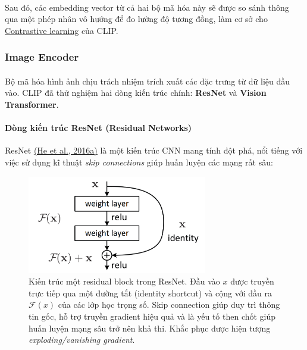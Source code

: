 \paragraph{}{Sau đó, các embedding vector từ cả hai bộ mã hóa này sẽ được so sánh thông qua một phép nhân vô hướng để đo lường độ tương đồng, làm cơ sở cho \hyperref[subsec:contrastive_learning]{Contrastive learning} của CLIP.}
\subsubsection{Image Encoder}
\paragraph{}{Bộ mã hóa hình ảnh chịu trách nhiệm trích xuất các đặc trưng từ dữ liệu đầu vào. CLIP đã thử nghiệm hai dòng kiến trúc chính: \textbf{ResNet} và \textbf{Vision Transformer}.}
\paragraph{Dòng kiến trúc ResNet (Residual Networks)}
ResNet \hyperref[resnet]{(He et al., 2016a)} là một kiến trúc CNN mang tính đột phá, nổi tiếng với việc sử dụng kĩ thuật \textit{skip connections} giúp huấn luyện các mạng rất sâu: 
\begin{figure}[H]
\centering
    \includegraphics[width=0.7\textwidth]{img/03-skip_connection.png}
    \caption{Kiến trúc một residual block trong ResNet. Đầu vào $x$ được truyền trực tiếp qua một đường tắt (identity shortcut) và cộng với đầu ra $\mathcal{F} (x)$ của các lớp học trọng số. Skip connection giúp duy trì thông tin gốc, hỗ trợ truyền gradient hiệu quả và là yếu tố then chốt giúp huấn luyện mạng sâu trở nên khả thi. Khắc phục được hiện tượng \textit{exploding/vanishing gradient}.}
    \label{fig:skip_connection}
\end{figure}

